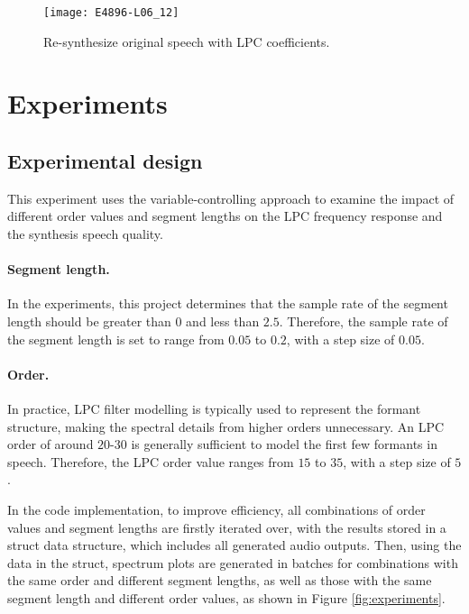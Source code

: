 \documentclass{article}
\begin{document}
\begin{figure}[h]
\begin{center}
\texttt{[image: E4896-L06\_12]}
\end{center}
\caption{\label{fig:synthesis} Re-synthesize original speech with LPC coefficients\citep{E4896-L06}.}
\end{figure}


\section{Experiments}

\subsection{Experimental design}

This experiment uses the variable-controlling approach to examine the impact of different order values and segment lengths on the LPC frequency response and the synthesis speech quality.

\paragraph{Segment length.}
In the experiments, this project determines that the sample rate of the segment length should be greater than $0$ and less than $2.5$. Therefore, the sample rate of the segment length is set to range from $0.05$ to $0.2$, with a step size of $0.05$.

\paragraph{Order.}
In practice, LPC filter modelling is typically used to represent the formant structure, making the spectral details from higher orders unnecessary. An LPC order of around $20$-$30$ is generally sufficient to model the first few formants in speech\citep{EEEM030}. Therefore, the LPC order value ranges from $15$ to $35$, with a step size of $5$.

In the code implementation, to improve efficiency, all combinations of order values and segment lengths are firstly iterated over, with the results stored in a struct data structure, which includes all generated audio outputs. Then, using the data in the struct, spectrum plots are generated in batches for combinations with the same order and different segment lengths, as well as those with the same segment length and different order values, as shown in Figure \ref{fig:experiments}.
\end{document}
